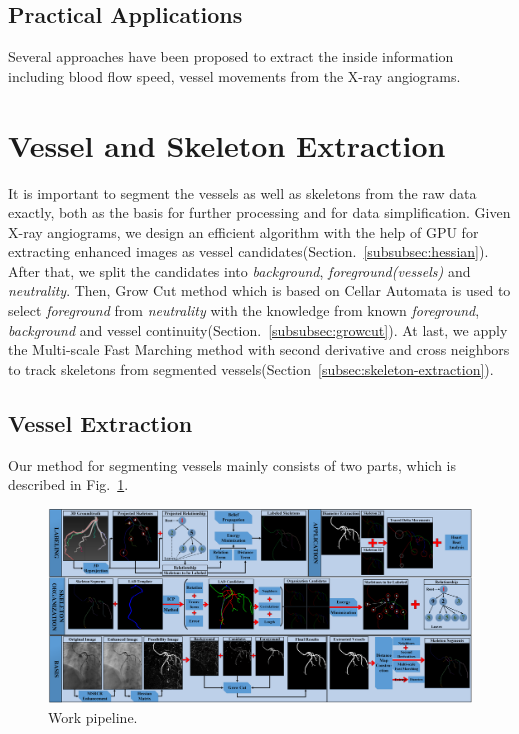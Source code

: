 \documentclass[journal]{IEEEtran}
\begin{document}
\subsection{Practical Applications}
Several approaches have been proposed to extract the inside information including blood flow speed, vessel movements from the X-ray angiograms.

\section{Vessel and Skeleton Extraction}
\label{sec:vessel-skeleton-extraction}
It is important to segment the vessels as well as skeletons from the raw data exactly, both as the basis for further processing and for data simplification. Given X-ray angiograms, we design an efficient algorithm with the help of GPU for extracting enhanced images as vessel candidates(Section.~\ref{subsubsec:hessian}). After that, we split the candidates into \textit{background}, \textit{foreground(vessels)} and \textit{neutrality}. Then, Grow Cut method which is based on Cellar Automata is used to select \textit{foreground} from \textit{neutrality} with the knowledge from known \textit{foreground}, \textit{background} and vessel continuity(Section.~\ref{subsubsec:growcut}).  At last, we apply the Multi-scale Fast Marching method with second derivative and cross neighbors to track skeletons from segmented vessels(Section~\ref{subsec:skeleton-extraction}).  

\subsection{Vessel Extraction}
\label{subsec:vessel-extraction}
Our method for segmenting vessels mainly consists of two parts, which is described in Fig.~\ref{fig:pip_extraction}. 
\begin{figure}[!t]
\centering
\includegraphics[width=1.0\linewidth]{./images/pipeline.png}
\caption{Work pipeline.}
\label{fig:pip_extraction}
\end{figure}
\end{document}
